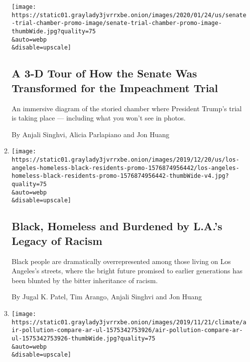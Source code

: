 \begin{enumerate}
  \texttt{[image: https://static01.graylady3jvrrxbe.onion/images/2020/01/24/us/senate-trial-chamber-promo-image/senate-trial-chamber-promo-image-thumbWide.jpg?quality=75\\\&auto=webp\\\&disable=upscale]}

  \hypertarget{a-3-d-tour-of-how-the-senate-was-transformed-for-the-impeachment-trial}{%
  \subsection{A 3-D Tour of How the Senate Was Transformed for the
  Impeachment
  Trial}\label{a-3-d-tour-of-how-the-senate-was-transformed-for-the-impeachment-trial}}

  An immersive diagram of the storied chamber where President Trump's
  trial is taking place --- including what you won't see in photos.

  By Anjali Singhvi, Alicia Parlapiano and Jon Huang
\item
  \href{/interactive/2019/12/22/us/los-angeles-homeless-black-residents.html}{}

  \texttt{[image: https://static01.graylady3jvrrxbe.onion/images/2019/12/20/us/los-angeles-homeless-black-residents-promo-1576874956442/los-angeles-homeless-black-residents-promo-1576874956442-thumbWide-v4.jpg?quality=75\\\&auto=webp\\\&disable=upscale]}

  \hypertarget{black-homeless-and-burdened-by-las-legacy-of-racism}{%
  \subsection{Black, Homeless and Burdened by L.A.'s Legacy of
  Racism}\label{black-homeless-and-burdened-by-las-legacy-of-racism}}

  Black people are dramatically overrepresented among those living on
  Los Angeles's streets, where the bright future promised to earlier
  generations has been blunted by the bitter inheritance of racism.

  By Jugal K. Patel, Tim Arango, Anjali Singhvi and Jon Huang
\item
  \href{/interactive/2019/12/02/climate/air-pollution-compare-ar-ul.html}{}

  \texttt{[image: https://static01.graylady3jvrrxbe.onion/images/2019/11/21/climate/air-pollution-compare-ar-ul-1575342753926/air-pollution-compare-ar-ul-1575342753926-thumbWide.jpg?quality=75\\\&auto=webp\\\&disable=upscale]}

  \hypertarget{see-how-the-worlds-most-polluted-air-compares-with-your-citys}{%
}
\end{enumerate}
